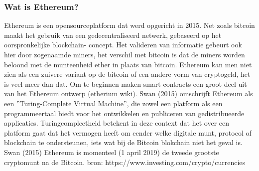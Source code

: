 		\subsubsection{Wat is Ethereum?}
			Ethereum is een opensourceplatform dat werd opgericht in 2015. Net zoals bitcoin maakt het gebruik van een gedecentraliseerd netwerk, gebaseerd op het oorspronkelijke blockchain- concept. Het valideren van informatie gebeurt ook hier door zogenaamde miners, het verschil met bitcoin is dat de miners worden beloond met de munteenheid ether in plaats van bitcoin. Ethereum kan men niet zien als een zuivere variant op de bitcoin of een andere vorm van cryptogeld, het is veel meer dan dat. Om te beginnen maken smart contracts  een groot deel uit van het Ethereum ontwerp (etherium wiki). Swan (2015) omschrijft Ethereum als een ”Turing-Complete Virtual Machine”, die zowel een platform als een programmeertaal biedt voor het ontwikkelen en publiceren van gedistribueerde applicaties. Turingcompleetheid betekent in deze context dat het over een platform gaat dat het vermogen heeft om eender welke digitale munt, protocol of blockchain te ondersteunen, iets wat bij de Bitcoin blokchain niet het geval is. Swan (2015)  Ethereum is momenteel (1 april 2019) de tweede grootste cryptomunt na de Bitcoin. bron: https://www.investing.com/crypto/currencies
			
